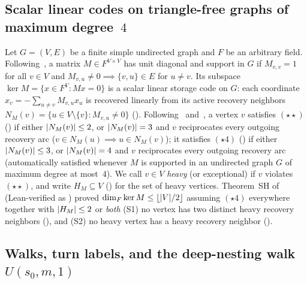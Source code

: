 \subsection{Scalar linear codes on triangle-free graphs of maximum degree~\texorpdfstring{$4$}{4}}

Let $G = (V, E)$ be a finite simple undirected graph and $F$ be an arbitrary field. Following~\cite[Section~8]{EighthPaper2026},
a matrix $M \in F^{V \times V}$ has unit diagonal and support in $G$ if $M_{v,v} = 1$ for all $v \in V$ and $M_{v,u} \ne 0
\implies \{v, u\} \in E$ for $u \ne v$. Its subspace $\ker M = \{x \in F^V : M x = 0\}$ is a scalar linear storage code on
$G$: each coordinate $x_v = -\sum_{u \ne v} M_{v,u} x_u$ is recovered linearly from its active recovery neighbors
$N_M(v) = \{u \in V \setminus \{v\} : M_{v,u} \ne 0\}$ (). Following~\cite[Section~6.6]{FourthPaper2026}
and~\cite[Section~8.2]{EighthPaper2026}, a vertex $v$ satisfies $(\star\star)$ () if either
$\lvert N_M(v) \rvert \le 2$, or $\lvert N_M(v) \rvert = 3$ and $v$ reciprocates every outgoing recovery arc ($v \in N_M(u) \implies u \in
N_M(v)$); it satisfies $(\star 4)$ () if either $\lvert N_M(v) \rvert \le 3$, or $\lvert N_M(v) \rvert = 4$
and $v$ reciprocates every outgoing recovery arc (automatically satisfied whenever $M$ is supported in an undirected graph
$G$ of maximum degree at most~$4$). We call $v \in V$ \emph{heavy} (or exceptional) if $v$ violates $(\star\star)$, and
write $H_M \subseteq V$ () for the set of heavy vertices. Theorem~SH
of~\cite[Section~8.2, Theorem~8.3]{EighthPaper2026} (Lean-verified as ) proved $\dim_F \ker M
\le \lfloor \lvert V \rvert/2 \rfloor$ assuming $(\star 4)$ everywhere together with $\lvert H_M \rvert \le 2$ or \emph{both} (S1) no
vertex has two distinct heavy recovery neighbors (), and (S2) no heavy vertex has a heavy
recovery neighbor ().

\subsection{Walks, turn labels, and the deep-nesting walk \texorpdfstring{$U(s_0, m, 1)$}{U(s0, m, 1)}}

